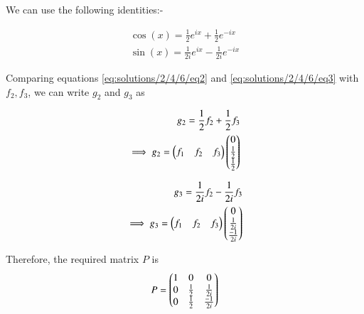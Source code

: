 \begin{enumerate}[label=(\alph*)]
		We can use the following identities:-
		
		\begin{align}
			\cos (x) = \frac{1}{2}e^{ix} + \frac{1}{2}e^{-ix} \label{eq:solutions/2/4/6/eq2}\\
			\sin (x) = \frac{1}{2i}e^{ix} - \frac{1}{2i}e^{-ix} \label{eq:solutions/2/4/6/eq3}
		\end{align}
		
		
		Comparing equations \eqref{eq:solutions/2/4/6/eq2} and \eqref{eq:solutions/2/4/6/eq3} with $f_2, f_3$, we can write $g_2$ and $g_3$ as 
		
		\begin{align}
			g_2 = \frac{1}{2}f_2 + \frac{1}{2}f_3 \\
			\implies g_2 = \begin{pmatrix}f_1 & f_2 & f_3\end{pmatrix} \begin{pmatrix}0\\\frac{1}{2}\\\frac{1}{2}\end{pmatrix}
		\end{align}
		
		\begin{align}
			g_3 = \frac{1}{2i}f_2 - \frac{1}{2i}f_3 \\
			\implies g_3 = \begin{pmatrix}f_1 & f_2 & f_3\end{pmatrix} \begin{pmatrix}0\\\frac{1}{2i}\\\frac{-1}{2i}\end{pmatrix}
		\end{align}
		
		Therefore, the required matrix $P$ is
		\begin{align}
			P = \begin{pmatrix}1&0&0\\0&\frac{1}{2}&\frac{1}{2i}\\0&\frac{1}{2}&\frac{-1}{2i}\end{pmatrix}
		\end{align}
		
	\end{enumerate}
	

